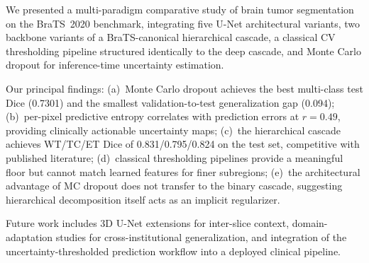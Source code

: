 \documentclass[conference]{IEEEtran}
\begin{document}
We presented a multi-paradigm comparative study of brain tumor
segmentation on the BraTS~2020 benchmark, integrating five U-Net
architectural variants, two backbone variants of a BraTS-canonical
hierarchical cascade, a classical CV thresholding pipeline structured
identically to the deep cascade, and Monte Carlo dropout for
inference-time uncertainty estimation.

Our principal findings: (a)~Monte Carlo dropout achieves the best
multi-class test Dice (0.7301) and the smallest validation-to-test
generalization gap (0.094); (b)~per-pixel predictive entropy correlates
with prediction errors at $r=0.49$, providing clinically actionable
uncertainty maps; (c)~the hierarchical cascade achieves WT/TC/ET Dice
of 0.831/0.795/0.824 on the test set, competitive with published
literature; (d)~classical thresholding pipelines provide a meaningful
floor but cannot match learned features for finer subregions;
(e)~the architectural advantage of MC dropout does not transfer to the
binary cascade, suggesting hierarchical decomposition itself acts as
an implicit regularizer.

Future work includes 3D U-Net extensions for inter-slice context,
domain-adaptation studies for cross-institutional generalization, and
integration of the uncertainty-thresholded prediction workflow into a
deployed clinical pipeline.
\end{document}
